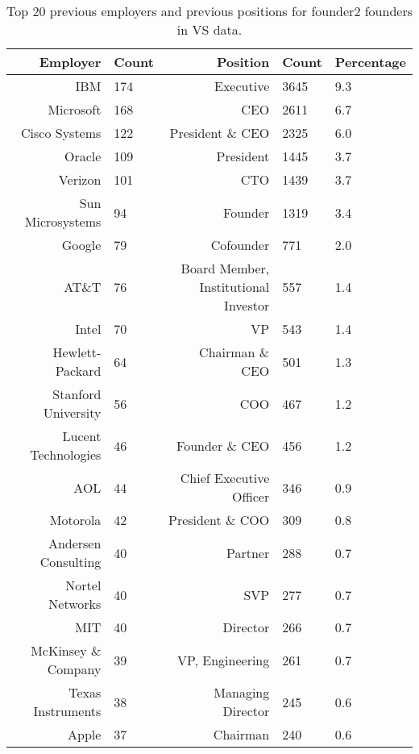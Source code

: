 \begin{table}[]
\centering
\begingroup\normalsize
\begin{tabular}{rlrll}
  \toprule
Employer & Count & Position & Count & Percentage \\ 
  \midrule
IBM & 174 & Executive & 3645 & 9.3 \\ 
  Microsoft & 168 & CEO & 2611 & 6.7 \\ 
  Cisco Systems & 122 & President \& CEO & 2325 & 6.0 \\ 
  Oracle & 109 & President & 1445 & 3.7 \\ 
  Verizon & 101 & CTO & 1439 & 3.7 \\ 
  Sun Microsystems & 94 & Founder & 1319 & 3.4 \\ 
  Google & 79 & Cofounder & 771 & 2.0 \\ 
  AT\&T & 76 & Board Member, Institutional Investor & 557 & 1.4 \\ 
  Intel & 70 & VP & 543 & 1.4 \\ 
  Hewlett-Packard & 64 & Chairman \& CEO & 501 & 1.3 \\ 
  Stanford University & 56 & COO & 467 & 1.2 \\ 
  Lucent Technologies & 46 & Founder \& CEO & 456 & 1.2 \\ 
  AOL & 44 & Chief Executive Officer & 346 & 0.9 \\ 
  Motorola & 42 & President \& COO & 309 & 0.8 \\ 
  Andersen Consulting & 40 & Partner & 288 & 0.7 \\ 
  Nortel Networks & 40 & SVP & 277 & 0.7 \\ 
  MIT & 40 & Director & 266 & 0.7 \\ 
  McKinsey \& Company & 39 & VP, Engineering & 261 & 0.7 \\ 
  Texas Instruments & 38 & Managing Director & 245 & 0.6 \\ 
  Apple & 37 & Chairman & 240 & 0.6 \\ 
   \bottomrule
\end{tabular}
\endgroup
\caption{Top 20 previous employers and previous positions for founder2 founders in VS data.} 
\label{table:VS_previousEmployersSummaryTable}
\end{table}
